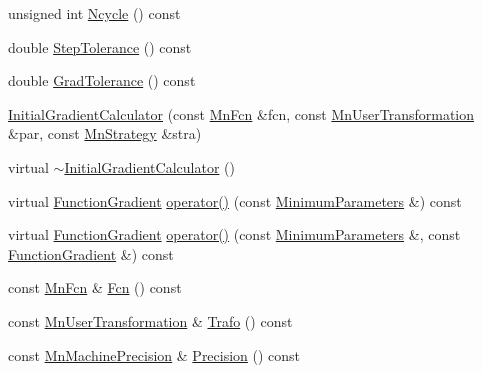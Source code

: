 \begin{DoxyCompactItemize}
\item 
unsigned int \mbox{\hyperlink{classROOT_1_1Minuit2_1_1InitialGradientCalculator_aef8f53869854439865a45497e011a41c}{Ncycle}} () const
\item 
double \mbox{\hyperlink{classROOT_1_1Minuit2_1_1InitialGradientCalculator_afc3c2d01aedfca1ca5ba35d231f9916d}{Step\+Tolerance}} () const
\item 
double \mbox{\hyperlink{classROOT_1_1Minuit2_1_1InitialGradientCalculator_aac6cfb88ce499207d304fdaf404b4f7d}{Grad\+Tolerance}} () const
\item 
\mbox{\hyperlink{classROOT_1_1Minuit2_1_1InitialGradientCalculator_a25d1c68548c1ada8fa395a3c684a61ec}{Initial\+Gradient\+Calculator}} (const \mbox{\hyperlink{classROOT_1_1Minuit2_1_1MnFcn}{Mn\+Fcn}} \&fcn, const \mbox{\hyperlink{classROOT_1_1Minuit2_1_1MnUserTransformation}{Mn\+User\+Transformation}} \&par, const \mbox{\hyperlink{classROOT_1_1Minuit2_1_1MnStrategy}{Mn\+Strategy}} \&stra)
\item 
virtual \mbox{\hyperlink{classROOT_1_1Minuit2_1_1InitialGradientCalculator_a5d0dc43f0bc924799d29f6640aae863f}{$\sim$\+Initial\+Gradient\+Calculator}} ()
\item 
virtual \mbox{\hyperlink{classROOT_1_1Minuit2_1_1FunctionGradient}{Function\+Gradient}} \mbox{\hyperlink{classROOT_1_1Minuit2_1_1InitialGradientCalculator_ae3f248b2e9e40bc62ee7dc68c8ee010f}{operator()}} (const \mbox{\hyperlink{classROOT_1_1Minuit2_1_1MinimumParameters}{Minimum\+Parameters}} \&) const
\item 
virtual \mbox{\hyperlink{classROOT_1_1Minuit2_1_1FunctionGradient}{Function\+Gradient}} \mbox{\hyperlink{classROOT_1_1Minuit2_1_1InitialGradientCalculator_a673e891a98df0e4a4f71442ab61084bb}{operator()}} (const \mbox{\hyperlink{classROOT_1_1Minuit2_1_1MinimumParameters}{Minimum\+Parameters}} \&, const \mbox{\hyperlink{classROOT_1_1Minuit2_1_1FunctionGradient}{Function\+Gradient}} \&) const
\item 
const \mbox{\hyperlink{classROOT_1_1Minuit2_1_1MnFcn}{Mn\+Fcn}} \& \mbox{\hyperlink{classROOT_1_1Minuit2_1_1InitialGradientCalculator_ab8c917922374b40c93ba5821f31d72e9}{Fcn}} () const
\item 
const \mbox{\hyperlink{classROOT_1_1Minuit2_1_1MnUserTransformation}{Mn\+User\+Transformation}} \& \mbox{\hyperlink{classROOT_1_1Minuit2_1_1InitialGradientCalculator_aba7febb81b50fd961a9f7f754413a5c9}{Trafo}} () const
\item 
const \mbox{\hyperlink{classROOT_1_1Minuit2_1_1MnMachinePrecision}{Mn\+Machine\+Precision}} \& \mbox{\hyperlink{classROOT_1_1Minuit2_1_1InitialGradientCalculator_a9f3821f6e60137b0cc9f25f85d96fbc5}{Precision}} () const

\end{DoxyCompactItemize}
